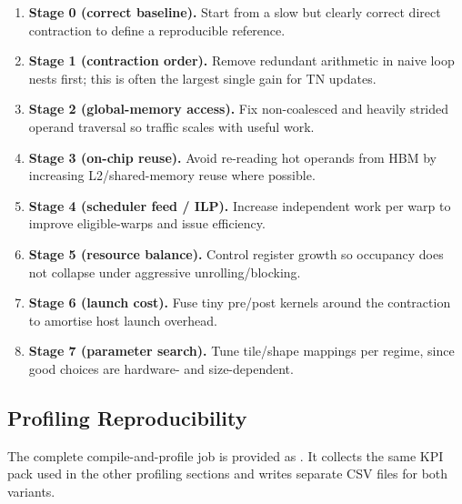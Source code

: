 \begin{enumerate}
  \item \textbf{Stage 0 (correct baseline).} Start from a slow but clearly
  correct direct contraction to define a reproducible reference.
  \item \textbf{Stage 1 (contraction order).} Remove redundant arithmetic in
  naive loop nests first; this is often the largest single gain for TN updates.
  \item \textbf{Stage 2 (global-memory access).} Fix non-coalesced and heavily
  strided operand traversal so traffic scales with useful work.
  \item \textbf{Stage 3 (on-chip reuse).} Avoid re-reading hot operands from
  HBM by increasing L2/shared-memory reuse where possible.
  \item \textbf{Stage 4 (scheduler feed / ILP).} Increase independent work per
  warp to improve eligible-warps and issue efficiency.
  \item \textbf{Stage 5 (resource balance).} Control register growth so
  occupancy does not collapse under aggressive unrolling/blocking.
  \item \textbf{Stage 6 (launch cost).} Fuse tiny pre/post kernels around the
  contraction to amortise host launch overhead.
  \item \textbf{Stage 7 (parameter search).} Tune tile/shape mappings per
  regime, since good choices are hardware- and size-dependent.
\end{enumerate}

\subsection{Profiling Reproducibility}

The complete compile-and-profile job is provided as
.
It collects the same KPI pack used in the other profiling sections and writes
separate CSV files for both variants.
